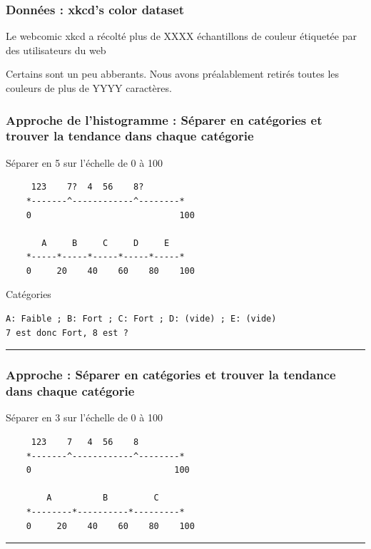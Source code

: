\documentclass[french]{beamer}
\begin{document}
\begin{frame}
\frametitle{Données : xkcd's color dataset}
Le webcomic xkcd a récolté plus de XXXX échantillons de couleur étiquetée par des utilisateurs du web

Certains sont un peu abberants. Nous avons préalablement retirés toutes les  couleurs de plus de YYYY caractères.

\end{frame}


\begin{frame}[fragile]
\frametitle{Approche de l'histogramme : Séparer en catégories et trouver la tendance dans chaque catégorie}

{Séparer en 5 sur l'échelle de 0 à
100}

\begin{verbatim}
     123    7?  4  56    8?
    *-------^------------^--------*
    0                             100

       A     B     C     D     E
    *-----*-----*-----*-----*-----*
    0     20    40    60    80    100
\end{verbatim}

{Catégories}

\begin{verbatim}
A: Faible ; B: Fort ; C: Fort ; D: (vide) ; E: (vide)
7 est donc Fort, 8 est ?
\end{verbatim}
\begin{center}\rule{3in}{0.4pt}\end{center}
\end{frame}

\begin{frame}[fragile]
\frametitle{Approche : Séparer en catégories et trouver la tendance dans
chaque
catégorie}

{Séparer en 3 sur l'échelle de 0 à
100}

\begin{verbatim}
     123    7   4  56    8 
    *-------^------------^--------*
    0                            100
    
        A          B         C
    *--------*----------*---------*
    0     20    40    60    80    100
\end{verbatim}
\begin{center}\rule{3in}{0.4pt}\end{center}
\end{frame}
\end{document}
